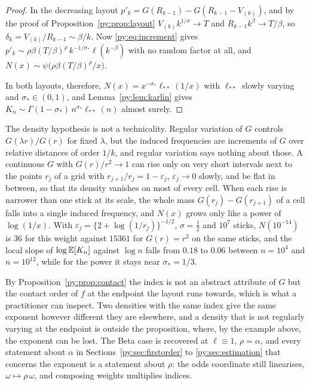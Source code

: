 \begin{proof}
In the decreasing layout $p'_k = G(R_{k-1}) - G(R_{k-1}-V_{(k)})$, and by the proof of Proposition~\ref{py:prop:layout} $V_{(k)}k^{1/\sigma} \to T$ and $R_{k-1}k^{\beta} \to T/\beta$, so $\delta_k = V_{(k)}/R_{k-1} \sim \beta/k$. Now \eqref{py:eq:increment} gives $p'_k \sim \rho\beta(T/\beta)^{\rho}\,k^{-1/\sigma_*}\ell(k^{-\beta})$ with no random factor at all, and $N(x) \sim \psi\big(\rho\beta(T/\beta)^{\rho}/x\big)$.

In both layouts, therefore, $N(x) = x^{-\sigma_*}\ell_{**}(1/x)$ with $\ell_{**}$ slowly varying and $\sigma_* \in (0,1)$, and Lemma~\ref{py:lem:karlin} gives $K_n \sim \Gamma(1-\sigma_*)\,n^{\sigma_*}\ell_{**}(n)$ almost surely.
\end{proof}

The density hypothesis is not a technicality. Regular variation of $G$ controls $G(\lambda r)/G(r)$ for fixed $\lambda$, but the induced frequencies are increments of $G$ over relative distances of order $1/k$, and regular variation says nothing about those. A continuous $G$ with $G(r)/r^{2} \to 1$ can rise only on very short intervals next to the points $r_j$ of a grid with $r_{j+1}/r_j = 1-\varepsilon_j$, $\varepsilon_j \to 0$ slowly, and be flat in between, so that its density vanishes on most of every cell. When each rise is narrower than one stick at its scale, the whole mass $G(r_j)-G(r_{j+1})$ of a cell falls into a single induced frequency, and $N(x)$ grows only like a power of $\log(1/x)$. With $\varepsilon_j = \{2+\log(1/r_j)\}^{-1/2}$, $\sigma = \tfrac12$ and $10^{7}$ sticks, $N(10^{-14})$ is $36$ for this weight against $15361$ for $G(r) = r^{2}$ on the same sticks, and the local slope of $\log\mathbb{E}[K_n]$ against $\log n$ falls from $0.18$ to $0.06$ between $n = 10^{4}$ and $n = 10^{12}$, while for the power it stays near $\sigma_* = 1/3$.

By Proposition~\ref{py:prop:contact} the index is not an abstract attribute of $G$ but the contact
order of $f$ at the endpoint the layout runs towards, which is what a practitioner can inspect. Two
densities with the same index give the same exponent however different they are elsewhere, and a
density that is not regularly varying at the endpoint is outside the proposition, where, by the
example above, the exponent can be lost. The
Beta case is recovered at $\ell \equiv 1$, $\rho = \alpha$, and every statement about $\alpha$ in
Sections~\ref{py:sec:firstorder} to \ref{py:sec:estimation} that concerns the exponent is a statement
about $\rho$: the odds coordinate still linearises, $\omega \mapsto \rho\,\omega$, and composing
weights multiplies indices.


